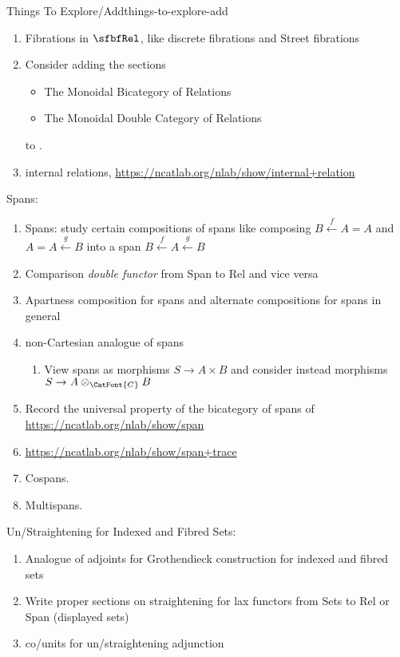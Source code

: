 \begin{remark}{Things To Explore/Add}{things-to-explore-add}
\begin{enumerate}
        \item Fibrations in $\sfbfRel$, like discrete fibrations and Street fibrations
        \item Consider adding the sections
            \begin{itemize}
                \item The Monoidal Bicategory of Relations
                \item The Monoidal Double Category of Relations
            \end{itemize}
            to \ChapterRelations.
        \item internal relations, \url{https://ncatlab.org/nlab/show/internal+relation}
    \end{enumerate}
    Spans:
    \begin{enumerate}
        \item Spans: study certain compositions of spans like composing $B\xleftarrow{f}A=A$ and $A=A\xleftarrow{g}B$ into a span $B\xleftarrow{f}A\xleftarrow{g}B$
        \item Comparison \emph{double functor} from Span to Rel and vice versa
        \item Apartness composition for spans and alternate compositions for spans in general
        \item non-Cartesian analogue of spans
            \begin{enumerate}
                \item View spans as morphisms $S\to A\times B$ and consider instead morphisms $S\to A\otimes_{\CatFont{C}}B$
            \end{enumerate}
        \item Record the universal property of the bicategory of spans of \url{https://ncatlab.org/nlab/show/span}
        \item \url{https://ncatlab.org/nlab/show/span+trace}
        \item Cospans.
        \item Multispans.
    \end{enumerate}
    Un/Straightening for Indexed and Fibred Sets:
    \begin{enumerate}
        \item Analogue of adjoints for Grothendieck construction for indexed and fibred sets
        \item Write proper sections on straightening for lax functors from Sets to Rel or Span (displayed sets)
        \item co/units for un/straightening adjunction

\end{enumerate}
\end{remark}
